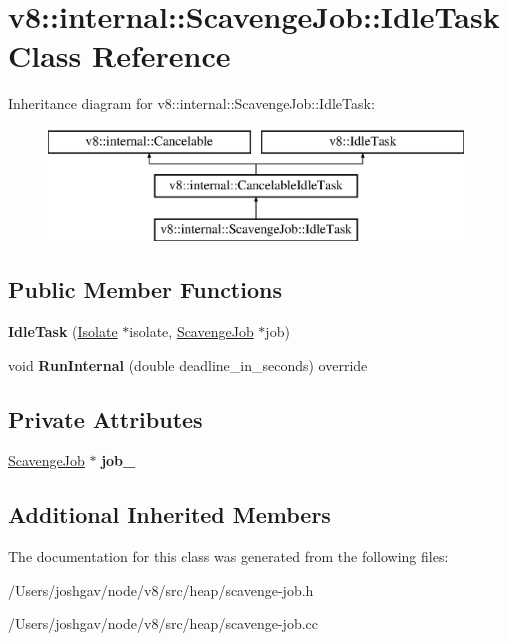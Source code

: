 \hypertarget{classv8_1_1internal_1_1_scavenge_job_1_1_idle_task}{}\section{v8\+:\+:internal\+:\+:Scavenge\+Job\+:\+:Idle\+Task Class Reference}
\label{classv8_1_1internal_1_1_scavenge_job_1_1_idle_task}
Inheritance diagram for v8\+:\+:internal\+:\+:Scavenge\+Job\+:\+:Idle\+Task\+:\begin{figure}[H]
\begin{center}
\leavevmode
\includegraphics[height=3.000000cm]{classv8_1_1internal_1_1_scavenge_job_1_1_idle_task}
\end{center}
\end{figure}
\subsection*{Public Member Functions}
\begin{DoxyCompactItemize}
\item 
{\bfseries Idle\+Task} (\hyperlink{classv8_1_1internal_1_1_isolate}{Isolate} $\ast$isolate, \hyperlink{classv8_1_1internal_1_1_scavenge_job}{Scavenge\+Job} $\ast$job)\hypertarget{classv8_1_1internal_1_1_scavenge_job_1_1_idle_task_a7ac8fdec66bd1d9c33b23eac199990e0}{}\label{classv8_1_1internal_1_1_scavenge_job_1_1_idle_task_a7ac8fdec66bd1d9c33b23eac199990e0}

\item 
void {\bfseries Run\+Internal} (double deadline\+\_\+in\+\_\+seconds) override\hypertarget{classv8_1_1internal_1_1_scavenge_job_1_1_idle_task_a8f2e8b5b8a25e35eeadfc61c55bbf29e}{}\label{classv8_1_1internal_1_1_scavenge_job_1_1_idle_task_a8f2e8b5b8a25e35eeadfc61c55bbf29e}

\end{DoxyCompactItemize}
\subsection*{Private Attributes}
\begin{DoxyCompactItemize}
\item 
\hyperlink{classv8_1_1internal_1_1_scavenge_job}{Scavenge\+Job} $\ast$ {\bfseries job\+\_\+}\hypertarget{classv8_1_1internal_1_1_scavenge_job_1_1_idle_task_a0b39e46515acffbecf0c837e0a4e6b7c}{}\label{classv8_1_1internal_1_1_scavenge_job_1_1_idle_task_a0b39e46515acffbecf0c837e0a4e6b7c}

\end{DoxyCompactItemize}
\subsection*{Additional Inherited Members}


The documentation for this class was generated from the following files\+:\begin{DoxyCompactItemize}
\item 
/\+Users/joshgav/node/v8/src/heap/scavenge-\/job.\+h\item 
/\+Users/joshgav/node/v8/src/heap/scavenge-\/job.\+cc\end{DoxyCompactItemize}
